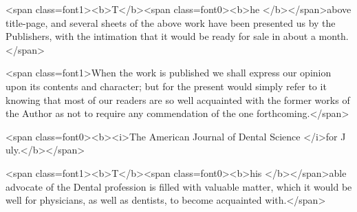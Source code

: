 <span class=font1><b>T</b><span class=font0><b>he </b></span>above title-page, and several sheets of the above work have
been presented us by the Publishers, with the intimation that it would
be ready for sale in about a month.</span>

<span class=font1>When the work is published we shall express our opinion upon its
contents and character; but for the present would simply refer to it
knowing that most of our readers are so well acquainted with the former
works of the Author as not to require any commendation of the one
forthcoming.</span>

<span class=font0><b><i>The American Journal of Dental Science </i>for J uly.</b></span>

<span class=font1><b>T</b><span class=font0><b>his </b></span>able advocate of the Dental profession is filled with valuable
matter, which it would be well for physicians, as well as dentists, to
become acquainted with.</span>\endinput
